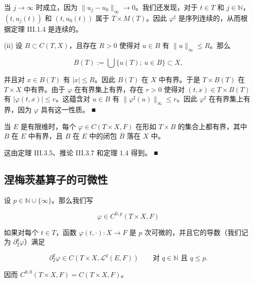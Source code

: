 \begin{theorem}
当 $ j \to \infty $ 时成立，因为 $ \|u_{j} - u_{0}\|_{\infty} \to 0 $。我们还发现，对于 $ t \in T $ 和 $ j \in \mathbb{N} $，$ (t, u_{j}(t)) $ 和 $ (t, u_{0}(t)) $ 属于 $ T \times M(T) $。因此 $ \varphi^{\sharp} $ 是序列连续的，从而根据定理 III.1.4 是连续的。

(ii) 设 $ B \subset C(T, X) $，且存在 $ R > 0 $ 使得对 $ u \in B $ 有 $ \|u\|_{\infty} \le R $。那么

\[
B(T) := \bigcup\{ u(T) ;\ u \in B \} \subset X ,
\]

并且对 $ x \in B(T) $ 有 $ |x| \le R $。因此 $ B(T) $ 在 $ X $ 中有界。于是 $ T \times B(T) $ 在 $ T \times X $ 中有界。由于 $ \varphi $ 在有界集上有界，存在 $ r > 0 $ 使得对 $ (t, x) \in T \times B(T) $ 有 $ |\varphi(t, x)| \le r $。这蕴含对 $ u \in B $ 有 $ \|\varphi^{\sharp}(u)\|_{\infty} \le r $。因此 $ \varphi^{\sharp} $ 在有界集上有界，因为 $ \varphi $ 具有这一性质。 \nobreak\hspace{0.35em}■

\end{theorem}

\begin{remark}

当 $ E $ 是有限维时，每个 $ \varphi \in C(T \times X, F) $ 在形如 $ T \times B $ 的集合上都有界，其中 $ B $ 在 $ E $ 中有界，且 $ B $ 在 $ E $ 中的闭包 $ \overline{B} $ 落在 $ X $ 中。

\proofhead
这由定理 III.3.5、推论 III.3.7 和定理 1.4 得到。 \nobreak\hspace{0.35em}■
\end{remark}

\subsection*{涅梅茨基算子的可微性}

设 $ p \in \mathbb{N} \cup \{\infty\} $。那么我们写

\[
\varphi \in C^{0,p}(T \times X, F)
\]

如果对每个 $ t \in T $，函数 $ \varphi(t, \cdot) : X \to F $ 是 $ p $ 次可微的，并且它的导数（我们记为 $ \partial_{2}^{q}\varphi $）满足

\[
\partial_{2}^{q}\varphi \in C(T \times X, \mathcal{L}^{q}(E, F)) \qquad \text{对 } q \in \mathbb{N} \text{ 且 } q \le p .
\]

因而 $ C^{0,0}(T \times X, F) = C(T \times X, F) $。

